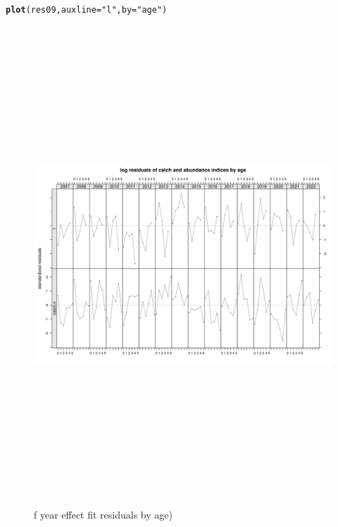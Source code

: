 \documentclass[a4paper,english,11pt]{article}\usepackage[]{graphicx}\usepackage[]{xcolor}
\makeatletter
\newcommand{\hlsng}[1]{\textcolor[rgb]{0.192,0.494,0.8}{#1}}%
\newcommand{\hldef}[1]{\textcolor[rgb]{0.345,0.345,0.345}{#1}}%
\newcommand{\hlkwc}[1]{\textcolor[rgb]{0.333,0.667,0.333}{#1}}%
\newcommand{\hlkwd}[1]{\textcolor[rgb]{0.737,0.353,0.396}{\textbf{#1}}}%
\newenvironment{kframe}{%
 \def\at@end@of@kframe{}%
 \ifinner\ifhmode%
  \def\at@end@of@kframe{\end{minipage}}%
  \begin{minipage}{\columnwidth}%
 \fi\fi%
 \def\FrameCommand##1{\hskip\@totalleftmargin \hskip-\fboxsep
 \colorbox{shadecolor}{##1}\hskip-\fboxsep
     \hskip-\linewidth \hskip-\@totalleftmargin \hskip\columnwidth}%
 \MakeFramed {\advance\hsize-\width
   \@totalleftmargin\z@ \linewidth\hsize
   \@setminipage}}%
 {\par\unskip\endMakeFramed%
 \at@end@of@kframe}
\newenvironment{knitrout}{}{} %
\makeatother
\begin{document}
\begin{knitrout}
\color{fgcolor}\begin{kframe}
\begin{alltt}
\hlkwd{plot}\hldef{(res09,} \hlkwc{auxline} \hldef{=} \hlsng{"l"}\hldef{,} \hlkwc{by} \hldef{=} \hlsng{"age"}\hldef{)}
\end{alltt}
\end{kframe}\begin{figure}[H]

{\centering \includegraphics[width=25cm,height=18cm,angle=90]{figure/srksresbyage-1} 

}

\caption[f year effect fit residuals by age)]{f year effect fit residuals by age)}\label{fig:srksresbyage}
\end{figure}

\end{knitrout}
\end{document}
